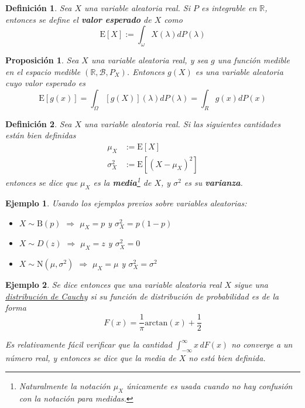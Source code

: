 \documentclass[12pt,letterpaper,draft]{book}
\newtheorem{definicion}{Definición}[chapter]
\newtheorem{proposicion}[teorema]{Proposición}
\newtheorem{ejemplo}{Ejemplo}[chapter]
\newcommand{\R}{\mathbb{R}}
\newcommand{\intR}{\int_{-\infty}^{\infty}}
\newcommand{\E}[1]{\mathrm{E}\left[ #1 \right]}
\begin{document}
\begin{definicion}
Sea $X$ una variable aleatoria real. Si $P$ es integrable en $\R$, entonces se define el \textbf{valor esperado} de $X$ como
\begin{equation}
\E{X} := \int_\omega X(\lambda) dP(\lambda)
\end{equation}
\end{definicion}

\begin{proposicion}
Sea $X$ una variable aleatoria real, y sea $g$ una función medible en el espacio medible $(\R,\mathcal{B},P_X)$. Entonces $g(X)$ es una variable aleatoria cuyo valor esperado es
\begin{equation}
\E{g(x)} = \int_\Omega [g(X)](\lambda) dP(\lambda) = \int_R g(x) dP(x)
\end{equation}
\end{proposicion}

\begin{definicion}
Sea $X$ una variable aleatoria real. Si las siguientes cantidades están bien definidas
\begin{align}
\mu_X &{:=} \E{X} \\
\sigma_X^{2} &{:=} \E{(X-\mu_X)^{2}}
\end{align}
entonces se dice que $\mu_X$ es la \textbf{media}\footnote{Naturalmente la notación $\mu_X$ únicamente es usada cuando no hay confusión con la notación para medidas.} de $X$, y $\sigma^2$ es su \textbf{varianza}.
\end{definicion}

\begin{ejemplo}
Usando los ejemplos previos sobre variables aleatorias:
\begin{itemize}
\item $X\sim \text{B}(p)$ $\Rightarrow$ $\mu_X = p$ y $\sigma^2_X = p(1-p)$
\item $X\sim D(z)$ $\Rightarrow$ $\mu_X = z$ y $\sigma^2_X = 0$
\item $X\sim \text{N}(\mu,\sigma^{2})$ $\Rightarrow$ $\mu_X = \mu$ y $\sigma^2_X = \sigma^2$
\end{itemize}
\end{ejemplo}

\begin{ejemplo}
Se dice entonces que una variable aleatoria real $X$ sigue una \ul{distribuci\'on de Cauchy} si su función de distribución de probabilidad es de la forma
\begin{equation}
F(x) = \frac{1}{\pi} \mathrm{arc tan}\left( x \right) + \frac{1}{2}
\end{equation}

Es relativamente fácil verificar que la cantidad $\intR x\, dF(x)$ no converge a un número real, y entonces se dice que la media de $X$ no está \textit{bien definida}.
\end{ejemplo}
\end{document}
